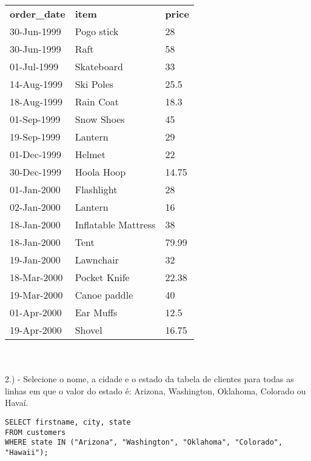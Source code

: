 \begin{tabular}{lll}
    {\textbf{order\_date}} & {\textbf{item}}       & {\textbf{price}} \\
    {30-Jun-1999}          & {Pogo stick}          & {28}             \\
    {30-Jun-1999}          & {Raft}                & {58}             \\
    {01-Jul-1999}          & {Skateboard}          & {33}             \\
    {14-Aug-1999}          & {Ski Poles}           & {25.5}           \\
    {18-Aug-1999}          & {Rain Coat}           & {18.3}           \\
    {01-Sep-1999}          & {Snow Shoes}          & {45}             \\
    {19-Sep-1999}          & {Lantern}             & {29}             \\
    {01-Dec-1999}          & {Helmet}              & {22}             \\
    {30-Dec-1999}          & {Hoola Hoop}          & {14.75}          \\
    {01-Jan-2000}          & {Flashlight}          & {28}             \\
    {02-Jan-2000}          & {Lantern}             & {16}             \\
    {18-Jan-2000}          & {Inflatable Mattress} & {38}             \\
    {18-Jan-2000}          & {Tent}                & {79.99}          \\
    {19-Jan-2000}          & {Lawnchair}           & {32}             \\
    {18-Mar-2000}          & {Pocket Knife}        & {22.38}          \\
    {19-Mar-2000}          & {Canoe paddle}        & {40}             \\
    {01-Apr-2000}          & {Ear Muffs}           & {12.5}           \\
    {19-Apr-2000}          & {Shovel}              & {16.75}         
\end{tabular} \\ \\


2.) - Selecione o nome, a cidade e o estado da tabela de clientes para todas as linhas em que o valor do estado é: Arizona, Washington, Oklahoma, Colorado ou Havaí.

\begin{lstlisting}
SELECT firstname, city, state
FROM customers
WHERE state IN ("Arizona", "Washington", "Oklahoma", "Colorado", "Hawaii");    
\end{lstlisting}

